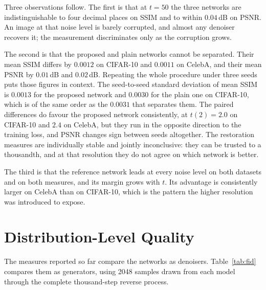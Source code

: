 Three observations follow. The first is that at $t = 50$ the three networks are indistinguishable to
four decimal places on SSIM and to within $0.04$\,dB on PSNR. An image at that noise level is barely
corrupted, and almost any denoiser recovers it; the measurement discriminates only as the corruption
grows.

The second is that the proposed and plain networks cannot be separated. Their mean SSIM differs by
$0.0012$ on CIFAR-10 and $0.0011$ on CelebA, and their mean PSNR by $0.01$\,dB and $0.02$\,dB.
Repeating the whole procedure under three seeds puts those figures in context. The seed-to-seed
standard deviation of mean SSIM is $0.0013$ for the proposed network and $0.0030$ for the plain one
on CIFAR-10, which is of the same order as the $0.0031$ that separates them. The paired differences
do favour the proposed network consistently, at $t(2) = 2.0$ on CIFAR-10 and $2.4$ on CelebA, but
they run in the opposite direction to the training loss, and PSNR changes sign between seeds
altogether. The restoration measures are individually stable and jointly inconclusive: they can be
trusted to a thousandth, and at that resolution they do not agree on which network is better.

The third is that the reference network leads at every noise level on both datasets and on both
measures, and its margin grows with $t$. Its advantage is consistently larger on CelebA than on
CIFAR-10, which is the pattern the higher resolution was introduced to expose.

\section{Distribution-Level Quality}
\label{sec:distribution}

The measures reported so far compare the networks as denoisers. Table~\ref{tab:fid} compares them as
generators, using 2048 samples drawn from each model through the complete thousand-step reverse
process.

